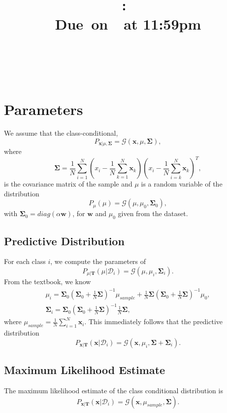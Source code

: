 \documentclass{article}
\title{
    \vspace{2in}
    \textmd{\textbf{\hmwkClass:\ \hmwkTitle}}\\
    \normalsize\vspace{0.1in}\small{Due\ on\ \hmwkDueDate\ at 11:59pm}\\
    \vspace{0.1in}\large{\textit{\hmwkClassInstructor}} \\
    \vspace{3in}
}
\author{
  \hmwkAuthorName \\
  \vspace{0.1in}\small\hmwkPID
}
\date{}
\newcommand*{\G}{\mathcal{G}}
\newcommand*{\D}{\mathcal{D}}
\begin{document}
\maketitle

\pagebreak

\section*{Parameters}

We assume that the class-conditional,
\[
    P_{\mathbf{x}|\mu, \mathbf{\Sigma}} = \G(\mathbf{x}, \mu, \mathbf{\Sigma}),
\]
where
\[
    \mathbf{\Sigma} = \frac{1}{N}\sum_{i = 1}^N \left(x_i - \frac{1}{N}\sum_{k = 1}^N \mathbf{x}_k\right)\left(x_i - \frac{1}{N}\sum_{i = k}^N \mathbf{x}_k\right)^T,
\]
is the covariance matrix of the sample and $\mu$ is a random variable of the distribution
\[
    P_{\mu}(\mu) = \G(\mu, \mu_0, \mathbf{\Sigma}_0),
\]
with $\mathbf{\Sigma}_0 = diag(\alpha\mathbf{w})$, for $\mathbf{w}$ and $\mu_0$ given from the dataset.

\subsection*{Predictive Distribution}

For each class $i$, we compute the parameters of
\[
    P_{\mu|\mathbf{T}}(\mu | \D_i) = \G(\mu, \mu_i, \mathbf{\Sigma}_i).
\]
From the textbook, we know
\begin{gather*}
    \mu_i = \mathbf{\Sigma}_0\left(\mathbf{\Sigma}_0 + \frac{1}{N}\mathbf{\Sigma}\right)^{-1}\mu_{sample} + \frac{1}{N}\mathbf{\Sigma}\left(\mathbf{\Sigma}_0 + \frac{1}{N}\mathbf{\Sigma}\right)^{-1}\mu_0, \\
    \mathbf{\Sigma}_i = \mathbf{\Sigma}_0\left(\mathbf{\Sigma}_0 + \frac{1}{N}\mathbf{\Sigma}\right)^{-1}\frac{1}{N}\mathbf{\Sigma},
\end{gather*}
where $\mu_{sample} = \frac{1}{N}\sum_{i = 1}^N \mathbf{x}_i$.
This immediately follows that the predictive distribution
\[
    P_{\mathbf{x}|\mathbf{T}}(\mathbf{x}|\D_i) = \G(\mathbf{x}, \mu_i, \mathbf{\Sigma} + \mathbf{\Sigma}_i).
\]

\subsection*{Maximum Likelihood Estimate}

The maximum likelihood estimate of the class conditional distribution is
\[
    P_{\mathbf{x}|\mathbf{T}}(\mathbf{x}|\D_i) = \G(\mathbf{x}, \mu_{sample}, \mathbf{\Sigma}).
\]
\end{document}
